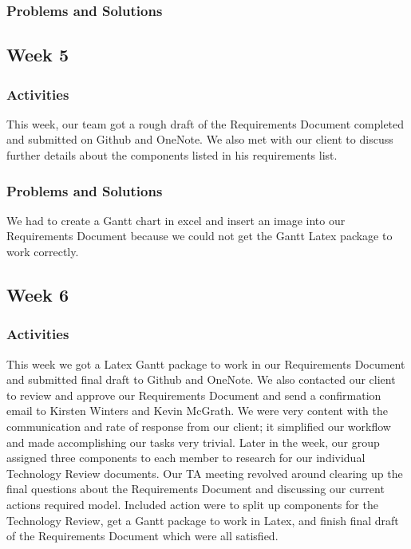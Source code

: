 \documentclass[journal,10pt,onecolumn,compsoc]{IEEEtran} \usepackage[margin=1.0in]{geometry} \usepackage{pdfpages}
\begin{document}
    \subsubsection{Problems and Solutions} 
    \subsection{Week 5}    
    \subsubsection{Activities} 
    This week, our team got a rough draft of the Requirements Document completed and submitted on Github and OneNote. We also met with our client to discuss further details about the components listed in his requirements list.


    \subsubsection{Problems and Solutions} 
    We had to create a Gantt chart in excel and insert an image into our Requirements Document because we could not get the Gantt Latex package to work correctly.
    \subsection{Week 6}
    \subsubsection{Activities} 
    This week we got a Latex Gantt package to work in our Requirements Document and submitted final draft to Github and OneNote. We also contacted our client to review and approve our Requirements Document and send a confirmation email to Kirsten Winters and Kevin McGrath. We were very content with the communication and rate of response from our client; it simplified our workflow and made accomplishing our tasks very trivial. Later in the week, our group assigned three components to each member to research for our individual Technology Review documents.
    \noindent Our TA meeting revolved around clearing up the final questions about the Requirements Document and discussing our current actions required model. Included action were to split up components for the Technology Review, get a Gantt package to work in Latex, and finish final draft of the Requirements Document which were all satisfied.
    
\end{document}
